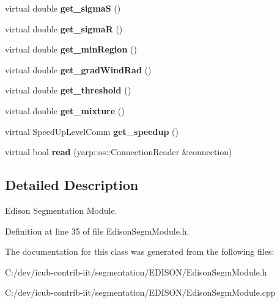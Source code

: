 \begin{DoxyCompactItemize}
\item 
virtual double {\bfseries get\+\_\+sigma\+S} ()\label{classEdisonSegmModule_a62aa5009cad7d09959ed5cdd8c358a90}

\item 
virtual double {\bfseries get\+\_\+sigma\+R} ()\label{classEdisonSegmModule_ad1045be0e10cd0d40c81396f48e54b9a}

\item 
virtual double {\bfseries get\+\_\+min\+Region} ()\label{classEdisonSegmModule_ad61a5ccea53f415be9f2b76a8781689f}

\item 
virtual double {\bfseries get\+\_\+grad\+Wind\+Rad} ()\label{classEdisonSegmModule_ab9ce5f24dd33f58d543b25ec0257af41}

\item 
virtual double {\bfseries get\+\_\+threshold} ()\label{classEdisonSegmModule_a8e3ab7941df516f42357330a80d1e408}

\item 
virtual double {\bfseries get\+\_\+mixture} ()\label{classEdisonSegmModule_a58df44d5dbba062170e5e22f957da907}

\item 
virtual Speed\+Up\+Level\+Comm {\bfseries get\+\_\+speedup} ()\label{classEdisonSegmModule_ae1f22b6113534640a3faedd22505932b}

\item 
virtual bool {\bfseries read} (yarp\+::os\+::\+Connection\+Reader \&connection)\label{classSegmentationModule_a99d3baa0d96cb5a8a7aeef226759ef73}

\end{DoxyCompactItemize}


\subsection{Detailed Description}
Edison Segmentation Module. 



Definition at line 35 of file Edison\+Segm\+Module.\+h.



The documentation for this class was generated from the following files\+:\begin{DoxyCompactItemize}
\item 
C\+:/dev/icub-\/contrib-\/iit/segmentation/\+E\+D\+I\+S\+O\+N/Edison\+Segm\+Module.\+h\item 
C\+:/dev/icub-\/contrib-\/iit/segmentation/\+E\+D\+I\+S\+O\+N/Edison\+Segm\+Module.\+cpp\end{DoxyCompactItemize}
